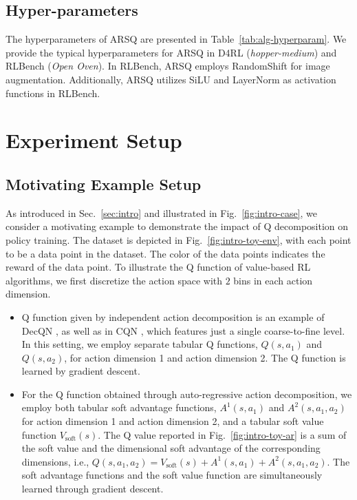 \subsection{Hyper-parameters}


The hyperparameters of ARSQ are presented in Table~\ref{tab:alg-hyperparam}. 
We provide the typical hyperparameters for ARSQ in D4RL (\textit{hopper-medium}) and RLBench (\textit{Open Oven}). 
In RLBench, ARSQ employs RandomShift \cite{DrQv2} for image augmentation. 
Additionally, ARSQ utilizes SiLU \cite{SiLU} and LayerNorm \cite{LayerNorm} as activation functions in RLBench.


\section{Experiment Setup}

\subsection{Motivating Example Setup}
\label{sec:app-example}

As introduced in Sec.~\ref{sec:intro} and illustrated in Fig.~\ref{fig:intro-case}, we consider a motivating example to demonstrate the impact of Q decomposition on policy training. 
The dataset is depicted in Fig.~\ref{fig:intro-toy-env}, with each point to be a data point in the dataset.
The color of the data points indicates the reward of the data point.
To illustrate the Q function of value-based RL algorithms, we first discretize the action space with $2$ bins in each action dimension. 

\begin{itemize}
    \item Q function given by independent action decomposition is an example of DecQN \cite{DecQN}, as well as in CQN \cite{CQN}, which features just a single coarse-to-fine level. 
    In this setting, we employ separate tabular Q functions, $Q(s, a_1)$ and $Q(s, a_2)$, for action dimension 1 and action dimension 2. 
    The Q function is learned by gradient descent.
    \item For the Q function obtained through auto-regressive action decomposition, we employ both tabular soft advantage functions, $A^1(s, a_1)$ and $A^2(s, a_1, a_2)$ for action dimension 1 and action dimension 2, and a tabular soft value function $V_{\text{soft}}(s)$. 
    The Q value reported in Fig.~\ref{fig:intro-toy-ar} is a sum of the soft value and the dimensional soft advantage of the corresponding dimensions, i.e., $Q(s, a_1, a_2) = V_{\text{soft}}(s) + A^1(s, a_1) + A^2(s, a_1, a_2)$. The soft advantage functions and the soft value function are simultaneously learned through gradient descent.
\end{itemize}



